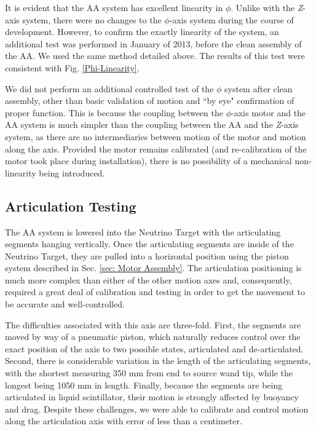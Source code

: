 It is evident that the AA system has excellent linearity in $\phi$. Unlike with the \emph{Z}-axis system, there were no changes to the $\phi$-axis system during the course of development. However, to confirm the exactly linearity of the system, an additional test was performed in January of 2013, before the clean assembly of the AA. We used the same method detailed above. The results of this test were consistent with Fig. \ref{Phi-Linearity}. 

We did not perform an additional controlled test of the $\phi$ system after clean assembly, other than basic validation of motion and ``by eye" confirmation of proper function. This is because the coupling between the $\phi$-axis motor and the AA system is much simpler than the coupling between the AA and the \emph{Z}-axis system, as there are no intermediaries between motion of the motor and motion along the axis. Provided the motor remains calibrated (and re-calibration of the motor took place during installation), there is no possibility of a mechanical non-linearity being introduced. 



\subsection{Articulation Testing}
The AA system is lowered into the Neutrino Target with the articulating segments hanging vertically. Once the articulating segments are inside of the Neutrino Target, they are pulled into a horizontal position using the piston system described in Sec. \ref{sec: Motor Assembly}. The articulation positioning is much more complex than either of the other motion axes and, consequently, required a great deal of calibration and testing in order to get the movement to be accurate and well-controlled. 

The difficulties associated with this axis are three-fold. First, the segments are moved by way of a pneumatic piston, which naturally reduces control over the exact position of the axis to two possible states, articulated and de-articulated. Second, there is considerable variation in the length of the articulating segments, with the shortest measuring 350 mm from end to source wand tip, while the longest being 1050 mm in length. Finally, because the segments are being articulated in liquid scintillator, their motion is strongly affected by buoyancy and drag. Despite these challenges, we were able to calibrate and control motion along the articulation axis with error of less than a centimeter. 

